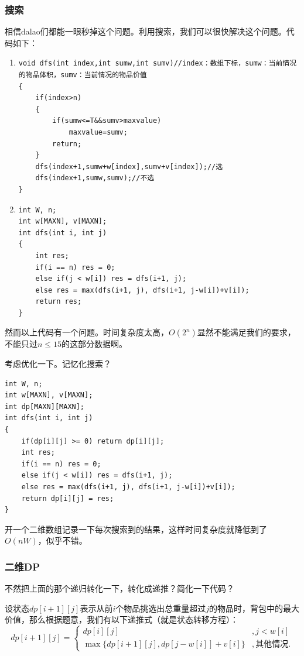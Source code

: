 \documentclass{article}
\theoremstyle{nonumberplain}
\begin{document}
\subsubsection{搜索}
相信dalao们都能一眼秒掉这个问题。利用搜索，我们可以很快解决这个问题。代码如下：
\begin{enumerate}
\item \begin{verbatim}
void dfs(int index,int sumw,int sumv)//index：数组下标，sumw：当前情况的物品体积，sumv：当前情况的物品价值
{ 
    if(index>n)  
    {  
        if(sumw<=T&&sumv>maxvalue)  
            maxvalue=sumv;  
        return;  
    }  
    dfs(index+1,sumw+w[index],sumv+v[index]);//选
    dfs(index+1,sumw,sumv);//不选
}\end{verbatim}
\item \begin{verbatim}  
int W, n;
int w[MAXN], v[MAXN];  
int dfs(int i, int j)
{  
    int res;  
    if(i == n) res = 0;   
    else if(j < w[i]) res = dfs(i+1, j);  
    else res = max(dfs(i+1, j), dfs(i+1, j-w[i])+v[i]);  
    return res;  
}
\end{verbatim}
\end{enumerate}
然而以上代码有一个问题。时间复杂度太高，$O(2^n)$显然不能满足我们的要求，不能只过$n\leq15$的这部分数据啊。

考虑优化一下。记忆化搜索？
\begin{verbatim}
int W, n;    
int w[MAXN], v[MAXN];  
int dp[MAXN][MAXN];  
int dfs(int i, int j)
{  
    if(dp[i][j] >= 0) return dp[i][j];  
    int res;   
    if(i == n) res = 0; 
    else if(j < w[i]) res = dfs(i+1, j);   
    else res = max(dfs(i+1, j), dfs(i+1, j-w[i])+v[i]);  
    return dp[i][j] = res;  
}
\end{verbatim}

开一个二维数组记录一下每次搜索到的结果，这样时间复杂度就降低到了$O(nW)$，似乎不错。
\subsubsection{二维DP}
不然把上面的那个递归转化一下，转化成递推？简化一下代码？

设状态$dp[i+1][j]$表示从前$i$个物品挑选出总重量超过$j$的物品时，背包中的最大价值，那么根据题意，我们有以下递推式（就是状态转移方程）：
\begin{equation*}
	dp[i+1][j]=\begin{cases}
		dp[i][j]                        & ,j<w[i]   \\
		\max\{dp[i+1][j],dp[j-w[i]]+v[i]\} & ,其他情况.
	\end{cases}
\end{equation*}
\end{document}

